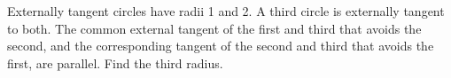 Externally tangent circles have radii 1 and 2. A third circle is externally tangent to both. The common external tangent of the first and third that avoids the second, and the corresponding tangent of the second and third that avoids the first, are parallel. Find the third radius.
